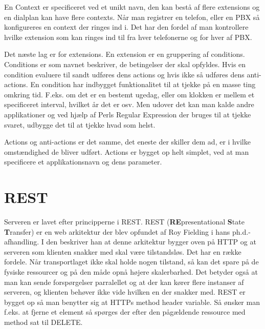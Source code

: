 En Context er specificeret ved et unikt navn, den kan bestå af flere extensions og en dialplan kan have flere contexts. Når man registrer en telefon, eller en PBX så konfigureres en context der ringes ind i. Det har den fordel af man kontrollere hvilke extension som kan ringes ind til fra hver telefonerne og for hver af PBX.

Det næste lag er for extensions. En extension er en gruppering af conditions.
Conditions er som navnet beskriver, de betingelser der skal opfyldes. 
Hvis en condition evaluere til sandt udføres dens actions og hvis ikke så udføres dens anti-actions.
En condition har indbygget funktionalitet til at tjekke på en masse ting omkring tid. F.eks. om det er en bestemt ugedag, eller om klokken er mellem et specificeret interval, hvilket år det er osv. Men udover det kan man kalde andre applikationer og ved hjælp af Perls Regular Expression der bruges til at tjekke svaret, udbygge det til at tjekke hvad som helst. 

Actions og anti-actions er det samme, det eneste der skiller dem ad, er i hvilke omstændighed de bliver udført. Actions er bygget op helt simplet, ved at man specificere et applikationsnavn og dens parameter.

\section{REST}
Serveren er lavet efter principperne i REST.
REST (\textbf{RE}presentational \textbf{S}tate \textbf{T}ransfer) er en web arkitektur der blev opfundet af Roy Fielding i hans ph.d.-afhandling. I den beskriver han at denne arkitektur bygger oven på HTTP og at serveren som klienten snakker med skal være tilstandsløs. Det har en række fordele. Når transportlaget ikke skal holde nogen tilstand, så kan det spare på de fysiske ressourcer og på den måde opnå højere skalerbarhed. Det betyder også at man kan sende forspørgelser parralellet og at der kan kører flere instanser af serveren, og klienten behøver ikke vide hvilken en der snakker med.
REST er bygget op så man benytter sig at HTTPs method header variable. Så ønsker man f.eks. at fjerne et element så spørges der efter den pågældende ressource med method sat til DELETE.




